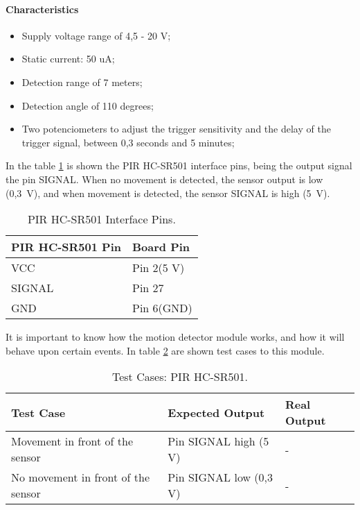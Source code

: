 \paragraph*{Characteristics}
\begin{itemize}
	\item Supply voltage range of 4,5 - 20 V;
	\item Static current: 50 uA;
	\item Detection range of 7 meters;
	\item Detection angle of 110 degrees;
	\item Two potenciometers to adjust the trigger sensitivity and the delay of the trigger signal, between 0,3 seconds and 5 minutes;
\end{itemize}

In the table \ref{table:pir} is shown the PIR HC-SR501 interface pins, being the output signal the pin SIGNAL. When no movement is detected, the sensor output is low (0,3~V), and when movement is detected, the sensor SIGNAL is high (5~V). 

\begin{table}[H]
	\centering
	\begin{tabular}{|m{5cm}|m{6cm}|}
		\hline
		\textbf{PIR HC-SR501 Pin} & \textbf{Board Pin}
		\\\hline\hline
		
		VCC & Pin 2(5 V)\\\hline
		SIGNAL & Pin 27\\\hline
		GND & Pin 6(GND)\\
		\hline
	\end{tabular}
	
\caption{PIR HC-SR501 Interface Pins.}
\label{table:pir}
\end{table}

It is important to know how the motion detector module works, and how it will behave upon certain events. In table \ref{table:test_pir} are shown test cases to this module.

\begin{table}[H]
	\centering
	\resizebox{\columnwidth}{!}
	{
		\begin{tabular}{|m{3cm}|m{5cm}||m{5cm}|}
			\hline
			\textbf{Test Case} & \textbf{Expected Output} & \textbf{Real Output}
			\\\hline\hline
			Movement in front of the sensor & Pin SIGNAL high (5 V) & -
			\\\hline
			No movement in front of the sensor & Pin SIGNAL low (0,3 V) & -
			\\\hline
		\end{tabular}
	}
	\caption{Test Cases: PIR HC-SR501.}
	\label{table:test_pir}
\end{table}

